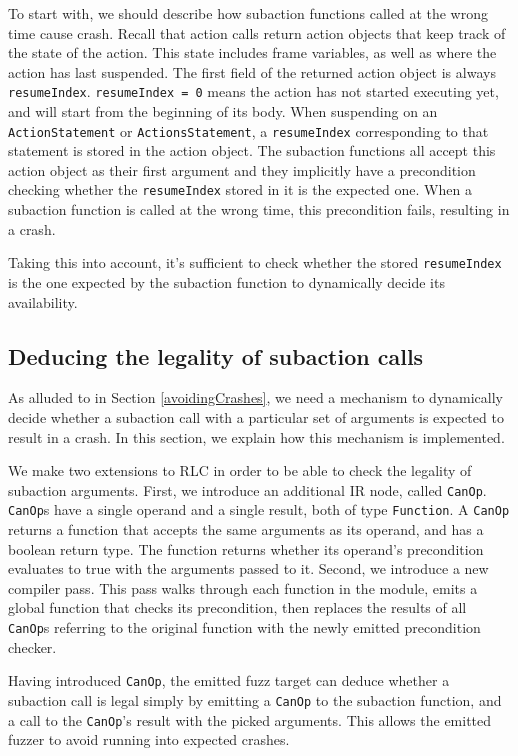 To start with, we should describe how subaction functions called at the wrong time cause crash.
Recall that action calls return action objects that keep track of the state of the action.
This state includes frame variables, as well as where the action has last suspended.
The first field of the returned action object is always \texttt{resumeIndex}.
\texttt{resumeIndex = 0} means the action has not started executing yet, and will start from the beginning of its body.
When suspending on an \texttt{ActionStatement} or \texttt{ActionsStatement}, a \texttt{resumeIndex} corresponding to that statement is stored in the action object.
The subaction functions all accept this action object as their first argument and they implicitly have a precondition checking whether the \texttt{resumeIndex} stored in it is the expected one.
When a subaction function is called at the wrong time, this precondition fails, resulting in a crash.

Taking this into account, it's sufficient to check whether the stored \texttt{resumeIndex} is the one expected by the subaction function to dynamically decide its availability.

\subsection{Deducing the legality of subaction calls}\label{decidingLegality}
As alluded to in Section \ref{avoidingCrashes}, we need a mechanism to dynamically decide whether a subaction call with a particular set of arguments is expected to result in a crash.
In this section, we explain how this mechanism is implemented.

We make two extensions to RLC in order to be able to check the legality of subaction arguments.
First, we introduce an additional IR node, called \texttt{CanOp}.
\texttt{CanOp}s have a single operand and a single result, both of type \texttt{Function}.
A \texttt{CanOp} returns a function that accepts the same arguments as its operand, and has a boolean return type.
The function returns whether its operand's precondition evaluates to true with the arguments passed to it.
Second, we introduce a new compiler pass.
This pass walks through each function in the module, emits a global function that checks its precondition, then replaces the results of all \texttt{CanOp}s referring to the original function with the newly emitted precondition checker.

Having introduced \texttt{CanOp}, the emitted fuzz target can deduce whether a subaction call is legal simply by emitting a \texttt{CanOp} to the subaction function, and a call to the \texttt{CanOp}'s result with the picked arguments.
This allows the emitted fuzzer to avoid running into expected crashes.

